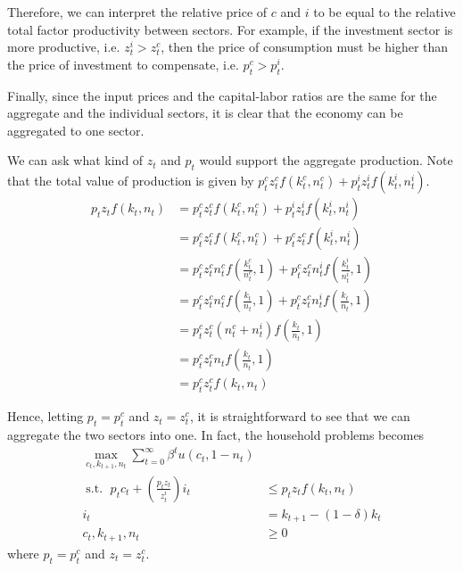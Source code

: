 \documentclass[12pt]{article}
\newcommand{\1}{{\bf 1}} %
\DeclareMathOperator{\subjectto}{{s.t.\ }} %
\begin{document}
Therefore, we can interpret the relative price of $c$ and $i$ to be equal to the relative total factor productivity between sectors. For example, if the investment sector is more productive, i.e. $z_t^i>z_t^c$, then the price of consumption must be higher than the price of investment to compensate, i.e. $p_t^c>p_t^i$.

Finally, since the input prices and the capital-labor ratios are the same for the aggregate and the individual sectors, it is clear that the economy can be aggregated to one sector. 

We can ask what kind of $z_t$ and $p_t$ would support the aggregate production. Note that the total value of production is given by $ p_t^cz_t^cf(k_t^c,n_t^c) +  p_t^iz_t^if(k_t^i,n_t^i)$.
\begin{align*}
p_tz_tf(k_t,n_t) & = p_t^cz_t^cf(k_t^c,n_t^c) +  p_t^iz_t^if(k_t^i,n_t^i)\\
 & = p_t^cz_t^cf(k_t^c,n_t^c) +  p_t^cz_t^cf(k_t^i,n_t^i) \\
  & = p_t^cz_t^c n_t^c f\left( \frac{k_t^c}{n_t^c},1\right) +  p_t^cz_t^c n_t^if\left( \frac{k_t^i}{n_t^i},1\right)\\
  & = p_t^cz_t^c n_t^c f\left( \frac{k_t}{n_t},1\right) +  p_t^cz_t^c n_t^if\left( \frac{k_t}{n_t},1\right)\\
  & = p_t^cz_t^c  (n_t^c +n_t^i) f\left( \frac{k_t}{n_t},1\right) \\
  & = p_t^cz_t^c  n_t f\left( \frac{k_t}{n_t},1\right) \\
  & = p_t^cz_t^c  f\left(k_t,n_t\right)
\end{align*}

Hence, letting $p_t=p_t^c$ and $z_t=z_t^c$, it is straightforward to see that we can aggregate the two sectors into one. In fact, the household problems becomes
		\begin{align*}
\max_{c_t,k_{t+1},n_{t}} \sum_{t=0}^{\infty}\beta^t u(c_t,1-n_t) \\
\subjectto p_tc_t+\left( \frac{p_tz_t}{z_t^i}\right) i_t &\leq p_tz_t f(k_t,n_t)  \\
i_t &=	k_{t+1}-(1-\delta)k_t  \\
c_t,k_{t+1},n_{t}	& \geq 0
\end{align*}
where $p_t=p_t^c$ and $z_t=z_t^c$.
\end{document}
